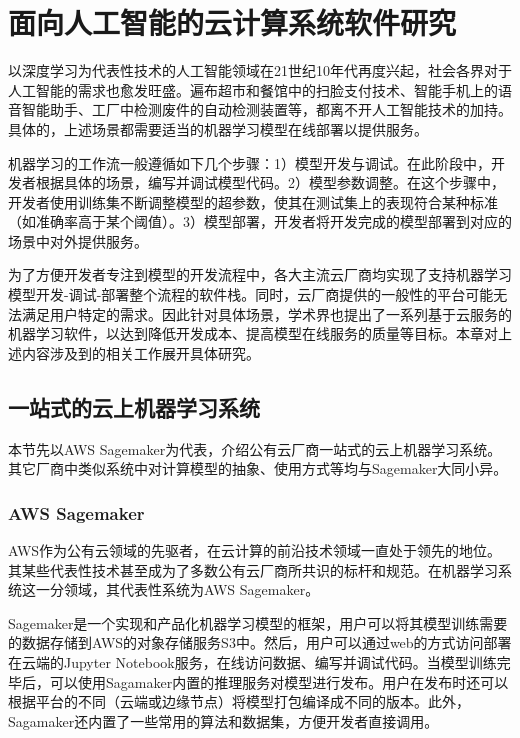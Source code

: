
\chapter{面向人工智能的云计算系统软件研究}
以深度学习为代表性技术的人工智能领域在21世纪10年代再度兴起，社会各界对于人工智能的需求也愈发旺盛。遍布超市和餐馆中的扫脸支付技术、智能手机上的语音智能助手、工厂中检测废件的自动检测装置等，都离不开人工智能技术的加持。具体的，上述场景都需要适当的机器学习模型在线部署以提供服务。

机器学习的工作流一般遵循如下几个步骤：1）模型开发与调试。在此阶段中，开发者根据具体的场景，编写并调试模型代码。2）模型参数调整。在这个步骤中，开发者使用训练集不断调整模型的超参数，使其在测试集上的表现符合某种标准（如准确率高于某个阈值）。3）模型部署，开发者将开发完成的模型部署到对应的场景中对外提供服务。

为了方便开发者专注到模型的开发流程中，各大主流云厂商均实现了支持机器学习模型开发-调试-部署整个流程的软件栈。同时，云厂商提供的一般性的平台可能无法满足用户特定的需求。因此针对具体场景，学术界也提出了一系列基于云服务的机器学习软件，以达到降低开发成本、提高模型在线服务的质量等目标。本章对上述内容涉及到的相关工作展开具体研究。

\section{一站式的云上机器学习系统}

本节先以AWS Sagemaker为代表，介绍公有云厂商一站式的云上机器学习系统。其它厂商中类似系统中对计算模型的抽象、使用方式等均与Sagemaker大同小异。

\subsection{AWS Sagemaker}
AWS作为公有云领域的先驱者，在云计算的前沿技术领域一直处于领先的地位。其某些代表性技术甚至成为了多数公有云厂商所共识的标杆和规范。在机器学习系统这一分领域，其代表性系统为AWS Sagemaker。

Sagemaker是一个实现和产品化机器学习模型的框架\parencite{joshi2020amazon}，用户可以将其模型训练需要的数据存储到AWS的对象存储服务S3中。然后，用户可以通过web的方式访问部署在云端的Jupyter Notebook服务，在线访问数据、编写并调试代码。当模型训练完毕后，可以使用Sagamaker内置的推理服务对模型进行发布。用户在发布时还可以根据平台的不同（云端或边缘节点）将模型打包编译成不同的版本。此外，Sagamaker还内置了一些常用的算法和数据集，方便开发者直接调用。

